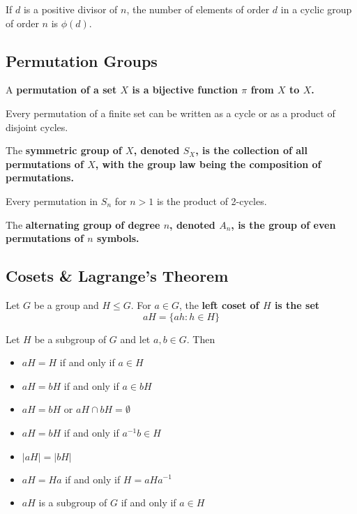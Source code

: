 \documentclass{hmwk}
\begin{document}
\begin{prop}
If $d$ is a positive divisor of $n$, the number of elements of order $d$ in a cyclic group of order $n$ is $\phi(d)$.
\end{prop}

\subsection{Permutation Groups}

\begin{defn}
A \bf{permutation} of a set $X$ is a bijective function $\pi$ from $X$ to $X$.
\end{defn}

\begin{prop}
Every permutation of a finite set can be written as a cycle or as a product of disjoint cycles. 
\end{prop}

\begin{defn}
The \bf{symmetric group of $X$}, denoted $S_X$, is the collection of all permutations of $X$, with the group law being the composition of permutations. 
\end{defn}

\begin{prop}
Every permutation in $S_n$ for $n > 1$ is the product of 2-cycles. 
\end{prop}

\begin{defn}
The \bf{alternating group of degree $n$}, denoted $A_n$, is the group of even permutations of $n$ symbols.
\end{defn}

\subsection{Cosets \& Lagrange's Theorem}

\begin{defn}
Let $G$ be a group and $H \leq G$. For $a \in G$, the \bf{left coset} of $H$ is the set $$aH = \{ah : h \in H\}$$
\end{defn}

\begin{prop}
Let $H$ be a subgroup of $G$ and let $a, b \in G$. Then 
\begin{itemize}
    \item $aH = H$ if and only if $a \in H$
    \item $aH = bH$ if and only if $a \in bH$
    \item $aH = bH$ or $aH \cap bH = \emptyset$
    \item $aH = bH$ if and only if $a^{-1}b \in H$
    \item $|aH| = |bH|$
    \item $aH = Ha$ if and only if $H = aHa^{-1}$
    \item $aH$ is a subgroup of $G$ if and only if $a \in H$
\end{itemize}
\end{prop}
\end{document}
